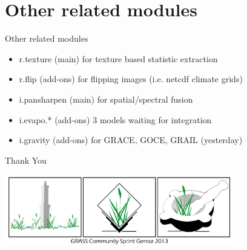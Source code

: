 \documentclass[xcolor=dvipsnames,beamer]{beamer} %
\begin{document}
\section{Other related modules}
\begin{frame}[fragile]{Other related modules}

\begin{itemize}
 \item r.texture (main) for texture based statistic extraction
 \item r.flip (add-ons) for flipping images (i.e. netcdf climate grids)
 \item i.pansharpen (main) for spatial/spectral fusion
 \item i.evapo.* (add-ons) 3 models waiting for integration
 \item i.gravity (add-ons) for GRACE, GOCE, GRAIL (yesterday)
\end{itemize}

\end{frame}
\begin{frame}[fragile]{Thank You}

\begin{center}
 \includegraphics[width=10cm]{genova2013}
\end{center}

\end{frame}
\end{document}
